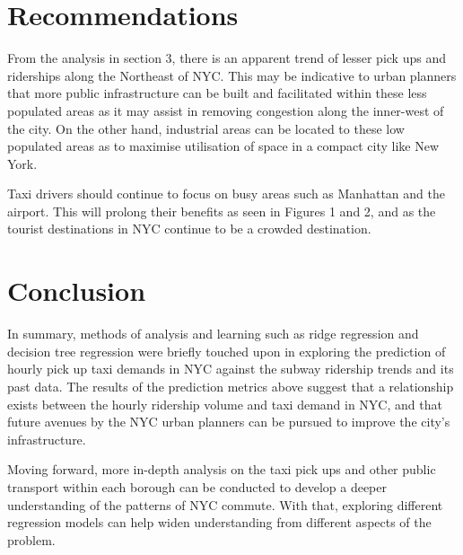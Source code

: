 \documentclass[11pt]{article}
\begin{document}
\section{Recommendations}
From the analysis in section 3, there is an apparent trend of lesser pick ups and riderships along the Northeast of NYC. This may be indicative to urban planners that more public infrastructure can be built and facilitated within these less populated areas as it may assist in removing congestion along the inner-west of the city. On the other hand, industrial areas can be located to these low populated areas as to maximise utilisation of space in a compact city like New York. 

Taxi drivers should continue to focus on busy areas such as Manhattan and the airport. This will prolong their benefits as seen in Figures 1 and 2, and as the tourist destinations in NYC continue to be a crowded destination.
\section{Conclusion}
In summary, methods of analysis and learning such as ridge regression and decision tree regression were briefly touched upon in exploring the prediction of hourly pick up taxi demands in NYC against the subway ridership trends and its past data. The results of the prediction metrics above suggest that a relationship exists between the hourly ridership volume and taxi demand in NYC, and that future avenues by the NYC urban planners can be pursued to improve the city's infrastructure.

Moving forward, more in-depth analysis on the taxi pick ups and other public transport within each borough can be conducted to develop a deeper understanding of the patterns of NYC commute. With that, exploring different regression models can help widen understanding from different aspects of the problem.

\clearpage

\printbibliography
\end{document}
